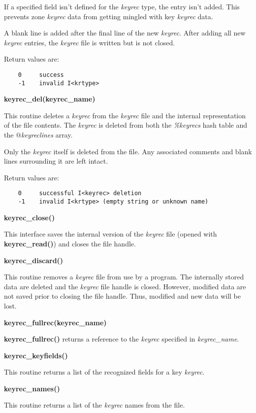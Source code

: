 If a specified field isn't defined for the {\it keyrec} type, the entry isn't
added.  This prevents zone {\it keyrec} data from getting mingled with key
{\it keyrec} data.

A blank line is added after the final line of the new {\it keyrec}.  After
adding all new {\it keyrec} entries, the {\it keyrec} file is written but is
not closed.

Return values are:

\begin{verbatim}
    0     success
    -1    invalid I<krtype>
\end{verbatim}

{\bf keyrec\_del(keyrec\_name)}

This routine deletes a {\it keyrec} from the {\it keyrec} file and the internal
representation of the file contents.  The {\it keyrec} is deleted from both
the {\it \%keyrecs} hash table and the {\it $@$keyreclines} array.

Only the {\it keyrec} itself is deleted from the file.  Any associated comments
and blank lines surrounding it are left intact.

Return values are:

\begin{verbatim}
    0     successful I<keyrec> deletion
    -1    invalid I<krtype> (empty string or unknown name)
\end{verbatim}

{\bf keyrec\_close()}

This interface saves the internal version of the {\it keyrec} file (opened
with {\bf keyrec\_read()}) and closes the file handle. 

{\bf keyrec\_discard()}

This routine removes a {\it keyrec} file from use by a program.  The internally
stored data are deleted and the {\it keyrec} file handle is closed.  However,
modified data are not saved prior to closing the file handle.  Thus, modified
and new data will be lost.

{\bf keyrec\_fullrec(keyrec\_name)}

{\bf keyrec\_fullrec()} returns a reference to the {\it keyrec} specified in
{\it keyrec\_name}.

{\bf keyrec\_keyfields()}

This routine returns a list of the recognized fields for a key {\it keyrec}.

{\bf keyrec\_names()}

This routine returns a list of the {\it keyrec} names from the file.


